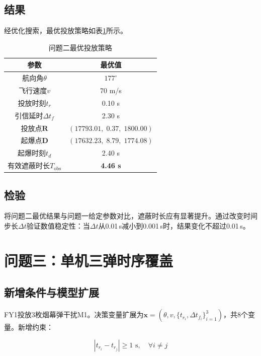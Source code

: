 \documentclass[a4paper]{ctexart}
\newcommand{\bm}[1]{\boldsymbol{#1}}
\begin{document}
\subsection{结果}

经优化搜索，最优投放策略如表\ref{tab:q2_result}所示。

\begin{table}[H]
\centering
{}
\caption{问题二最优投放策略}
\label{tab:q2_result}
\begin{tabular}{c|c}
\toprule
参数 & 最优值 \\
\midrule
航向角$\theta$ & $177^\circ$ \\
飞行速度$v$ & 70 m/s \\
投放时刻$t_r$ & 0.10 s \\
引信延时$\Delta t_f$ & 2.30 s \\
投放点$\bm{R}$ & $(17793.01,\; 0.37,\; 1800.00)$ \\
起爆点$\bm{D}$ & $(17632.23,\; 8.79,\; 1774.08)$ \\
起爆时刻$t_d$ & 2.40 s \\
有效遮蔽时长$T_{\text{obs}}$ & \textbf{4.46 s} \\
\bottomrule
\end{tabular}
\end{table}

\subsection{检验}

将问题二最优结果与问题一给定参数对比，遮蔽时长应有显著提升。通过改变时间步长$\Delta t$验证数值稳定性：当$\Delta t$从0.01\,s减小到0.001\,s时，结果变化不超过0.01\,s。

\section{问题三：单机三弹时序覆盖}

\subsection{新增条件与模型扩展}

FY1投放3枚烟幕弹干扰M1。决策变量扩展为$\bm{x} = (\theta, v, \{t_{r_i}, \Delta t_{f_i}\}_{i=1}^{3})$，共8个变量。新增约束：

\begin{equation}
|t_{r_i} - t_{r_j}| \geq 1 \text{ s}, \quad \forall i \neq j
\label{eq:constraint_interval}
\end{equation}
\end{document}
